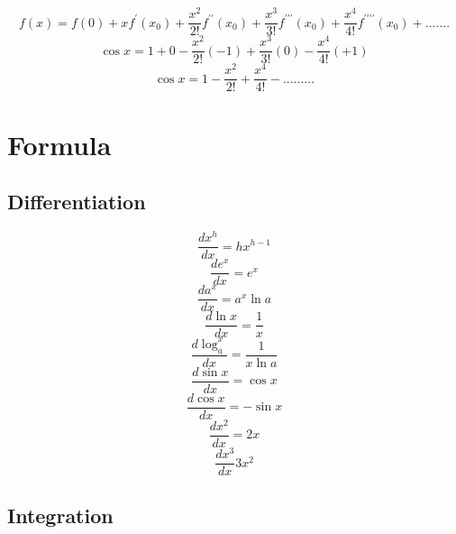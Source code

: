 \begin{displaymath}
f(x) = f(0)+xf^\prime(x_0)+\frac{x^2}{2!}f^{\prime\prime}(x_0)+\frac{x^3}{3!}f^{\prime\prime\prime}(x_0)+\frac{x^4}{4!}
f^{\prime\prime\prime\prime}(x_0)+.......
\end{displaymath}
\begin{displaymath}
\cos x = 1+0-\frac{x^2}{2!}(-1)+\frac{x^3}{3!}(0)-\frac{x^4}{4!}(+1)
\end{displaymath}
\begin{displaymath}
\cos x = 1-\frac{x^2}{2!}+\frac{x^4}{4!}-.........
\end{displaymath}

\section{Formula}
	\subsection{Differentiation}
	
	\begin{equation}
	\frac{dx^h}{dx} = hx^{h-1}
	\end{equation}
	\begin{equation}
	\frac{de^x}{dx} = e^x
	\end{equation}
	\begin{equation}
	\frac{da^x}{dx} = a^x \ln a
	\end{equation}
	\begin{equation}
	\frac{d\ln x}{dx} = \frac{1}{x}
	\end{equation}
	\begin{equation}
	\frac{d\log_a^x}{dx} = \frac{1}{x\ln a}
	\end{equation}
	\begin{equation}
	\frac{d\sin x}{dx} = \cos x
	\end{equation}
	\begin{equation}
	\frac{d\cos x}{dx} = -\sin x
	\end{equation}
	\begin{equation}
	\frac{dx^2}{dx} = 2x
	\end{equation}
	\begin{equation}
	\frac{dx^3}{dx} 3x^2
	\end{equation}
	
	\subsection{Integration}
	
